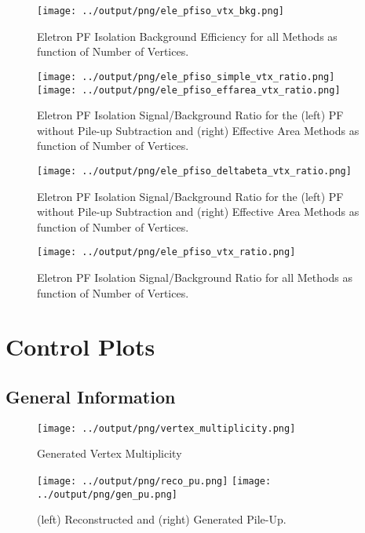 \documentclass[11pt]{book}
\begin{document}
\begin{figure}[htb]
\centering
\texttt{[image: ../output/png/ele\_pfiso\_vtx\_bkg.png]}
\caption{Eletron PF Isolation Background Efficiency for all Methods as function of Number of Vertices.}
\label{fig:ele_pfiso_vtx_bkg}
\end{figure}

\begin{figure}[htb]
\centering
\texttt{[image: ../output/png/ele\_pfiso\_simple\_vtx\_ratio.png]}
\texttt{[image: ../output/png/ele\_pfiso\_effarea\_vtx\_ratio.png]}
\caption{Eletron PF Isolation Signal/Background Ratio for the (left) PF without Pile-up Subtraction and (right) Effective Area Methods as function of Number of Vertices.}
\label{fig:ele_pfiso_vtx_ratio_simple_effarea}
\end{figure}

\begin{figure}[htb]
\centering
\texttt{[image: ../output/png/ele\_pfiso\_deltabeta\_vtx\_ratio.png]}
\caption{Eletron PF Isolation Signal/Background Ratio for the (left) PF without Pile-up Subtraction and (right) Effective Area Methods as function of Number of Vertices.}
\label{fig:ele_pfiso_vtx_ratio_deltabeta}
\end{figure}

\begin{figure}[htb]
\centering
\texttt{[image: ../output/png/ele\_pfiso\_vtx\_ratio.png]}
\caption{Eletron PF Isolation Signal/Background Ratio for all Methods as function of Number of Vertices.}
\label{fig:ele_pfiso_vtx_ratio}
\end{figure}
\clearpage

\chapter{Control Plots}
\section{General Information}
\begin{figure}[htb]
\centering
\texttt{[image: ../output/png/vertex\_multiplicity.png]}
\caption{Generated Vertex Multiplicity}
\label{fig:vertex_multiplicity}
\end{figure}
\clearpage


\begin{figure}[htb]
\centering
\texttt{[image: ../output/png/reco\_pu.png]}
\texttt{[image: ../output/png/gen\_pu.png]}
\caption{(left) Reconstructed and (right) Generated Pile-Up.}
\label{fig:reco_gen_pu}
\end{figure}
\clearpage
\end{document}
